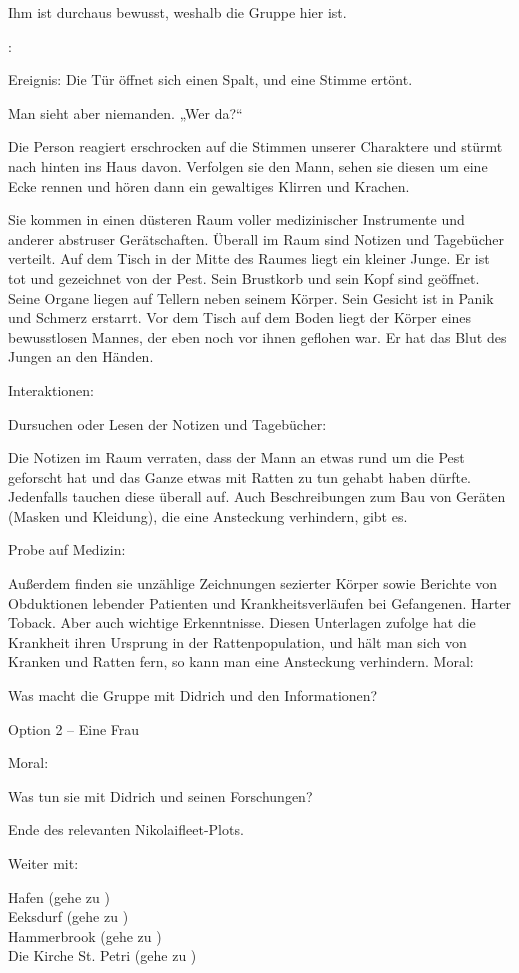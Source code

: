 Ihm ist durchaus bewusst, weshalb die Gruppe hier ist.





:

Ereignis: Die Tür öffnet sich einen Spalt, und eine Stimme ertönt.

Man sieht aber niemanden. „Wer da?“

Die Person reagiert erschrocken auf die Stimmen unserer Charaktere und stürmt nach hinten ins Haus davon. Verfolgen sie den Mann, sehen sie diesen um eine Ecke rennen und hören dann ein gewaltiges Klirren und Krachen.

Sie kommen in einen düsteren Raum voller medizinischer Instrumente und anderer abstruser Gerätschaften. Überall im Raum sind Notizen und Tagebücher verteilt. Auf dem Tisch in der Mitte des Raumes liegt ein kleiner Junge. Er ist tot und gezeichnet von der Pest. Sein Brustkorb und sein Kopf sind geöffnet. Seine Organe liegen auf Tellern neben seinem Körper. Sein Gesicht ist in Panik und Schmerz erstarrt. Vor dem Tisch auf dem Boden liegt der Körper eines bewusstlosen Mannes, der eben noch vor ihnen geflohen war. Er hat das Blut des Jungen an den Händen.

Interaktionen:

Dursuchen oder Lesen der Notizen und Tagebücher:

Die Notizen im Raum verraten, dass der Mann an etwas rund um die Pest geforscht hat und das Ganze etwas mit Ratten zu tun gehabt haben dürfte. Jedenfalls tauchen diese überall auf. Auch Beschreibungen zum Bau von Geräten (Masken und Kleidung), die eine Ansteckung verhindern, gibt es.

Probe auf Medizin:

Außerdem finden sie unzählige Zeichnungen sezierter Körper sowie Berichte von Obduktionen lebender Patienten und Krankheitsverläufen bei Gefangenen. Harter Toback. Aber auch wichtige Erkenntnisse. Diesen Unterlagen zufolge hat die Krankheit ihren Ursprung in der Rattenpopulation, und hält man sich von Kranken und Ratten fern, so kann man eine Ansteckung verhindern.
Moral:

Was macht die Gruppe mit Didrich und den Informationen?

Option 2 – Eine Frau



Moral:

Was tun sie mit Didrich und seinen Forschungen?

Ende des relevanten Nikolaifleet-Plots.

Weiter mit:

Hafen (gehe zu \blue{\ref{Hafen}}) \\
Eeksdurf (gehe zu \blue{\ref{xd}}) \\
Hammerbrook (gehe zu \blue{\ref{arm}}) \\
Die Kirche St. Petri (gehe zu \blue{\ref{Petri}}) \\
